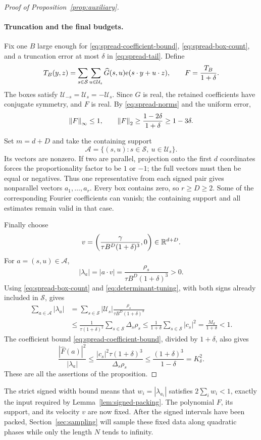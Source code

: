 \begin{proof}[Proof of Proposition~\ref{prop:auxiliary}]
\paragraph{Truncation and the final budgets.}
Fix one $B$ large enough for \eqref{eq:spread-coefficient-bound},
\eqref{eq:spread-box-count}, and a truncation error at most $\delta$
in \eqref{eq:spread-tail}.  Define
\[
 T_B(y,z)=\sum_{s\in\mathcal S}\sum_{u\in\mathcal U_s}
              \widehat G(s,u)\mathrm e(s\cdot y+u\cdot z),
 \qquad F=\frac{T_B}{1+\delta}.
\]
The boxes satisfy $\mathcal U_{-s}=\mathcal U_s=-\mathcal U_s$.
Since $G$ is real, the retained coefficients have conjugate symmetry,
and $F$ is real.  By \eqref{eq:spread-norms} and the uniform error,
\[
 \left\lVert F\right\rVert_\infty\le1,
 \qquad
 \left\lVert F\right\rVert_2\ge\frac{1-2\delta}{1+\delta}\ge1-3\delta.
\]

Set $m=d+D$ and take the containing support
\[
 \mathcal A=\{(s,u):s\in\mathcal S,\ u\in\mathcal U_s\}.
\]
Its vectors are nonzero.  If two are parallel, projection onto the
first $d$ coordinates forces the proportionality factor to be $1$
or $-1$; the full vectors must then be equal or negatives.
Thus one representative from each signed pair gives nonparallel
vectors $a_1,\ldots,a_r$.  Every box contains zero, so $r\ge D\ge2$.
Some of the corresponding Fourier coefficients can vanish; the
containing support and all estimates remain valid in that case.

Finally choose
\[
 v=\left(\frac{\gamma}{\tau B^D(1+\delta)^3},0\right)\in\mathbb R^{d+D}.
\]
For $a=(s,u)\in\mathcal A$,
\[
 |\lambda_a|=|a\cdot v|
 =\frac{\rho_s}{\tau B^D(1+\delta)^3}>0.
\]
Using \eqref{eq:spread-box-count} and
\eqref{eq:determinant-tuning}, with both signs already included in
$\mathcal S$, gives
\begin{align*}
 \sum_{a\in\mathcal A}|\lambda_a|
 &=\sum_{s\in\mathcal S}|\mathcal U_s|
     \frac{\rho_s}{\tau B^D(1+\delta)^3}\\
 &\le\frac1{\tau(1+\delta)^2}\sum_{s\in\mathcal S}\Delta_s\rho_s
 \le\frac1{1+\delta}\sum_{s\in\mathcal S}|c_s|^2
 =\frac{M_d}{1+\delta}<1.
\end{align*}
The coefficient bound \eqref{eq:spread-coefficient-bound}, divided
by $1+\delta$, also gives
\[
 \frac{|\widehat F(a)|^2}{|\lambda_a|}
 \le\frac{|c_s|^2\tau(1+\delta)^3}{\Delta_s\rho_s}
 \le\frac{(1+\delta)^3}{1-\delta}=K_\delta^2.
\]
These are all the assertions of the proposition.
\end{proof}

The strict signed width bound means that
$w_i=|\lambda_{a_i}|$ satisfies $2\sum_iw_i<1$, exactly the input
required by Lemma~\ref{lem:signed-packing}.  The polynomial $F$, its
support, and its velocity $v$ are now fixed.  After the signed intervals have been packed, Section~\ref{sec:sampling}
will sample these fixed data along quadratic phases while only the length
$N$ tends to infinity.
